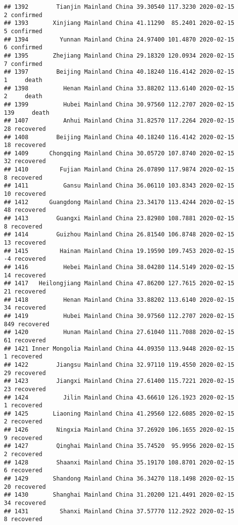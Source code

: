 \documentclass[
]{article}
\begin{document}
\begin{verbatim}
## 1392        Tianjin Mainland China 39.30540 117.3230 2020-02-15     2 confirmed
## 1393       Xinjiang Mainland China 41.11290  85.2401 2020-02-15     5 confirmed
## 1394         Yunnan Mainland China 24.97400 101.4870 2020-02-15     6 confirmed
## 1395       Zhejiang Mainland China 29.18320 120.0934 2020-02-15     7 confirmed
## 1397        Beijing Mainland China 40.18240 116.4142 2020-02-15     1     death
## 1398          Henan Mainland China 33.88202 113.6140 2020-02-15     2     death
## 1399          Hubei Mainland China 30.97560 112.2707 2020-02-15   139     death
## 1407          Anhui Mainland China 31.82570 117.2264 2020-02-15    28 recovered
## 1408        Beijing Mainland China 40.18240 116.4142 2020-02-15    18 recovered
## 1409      Chongqing Mainland China 30.05720 107.8740 2020-02-15    32 recovered
## 1410         Fujian Mainland China 26.07890 117.9874 2020-02-15     8 recovered
## 1411          Gansu Mainland China 36.06110 103.8343 2020-02-15    10 recovered
## 1412      Guangdong Mainland China 23.34170 113.4244 2020-02-15    48 recovered
## 1413        Guangxi Mainland China 23.82980 108.7881 2020-02-15     8 recovered
## 1414        Guizhou Mainland China 26.81540 106.8748 2020-02-15    13 recovered
## 1415         Hainan Mainland China 19.19590 109.7453 2020-02-15    -4 recovered
## 1416          Hebei Mainland China 38.04280 114.5149 2020-02-15    14 recovered
## 1417   Heilongjiang Mainland China 47.86200 127.7615 2020-02-15    21 recovered
## 1418          Henan Mainland China 33.88202 113.6140 2020-02-15    34 recovered
## 1419          Hubei Mainland China 30.97560 112.2707 2020-02-15   849 recovered
## 1420          Hunan Mainland China 27.61040 111.7088 2020-02-15    61 recovered
## 1421 Inner Mongolia Mainland China 44.09350 113.9448 2020-02-15     1 recovered
## 1422        Jiangsu Mainland China 32.97110 119.4550 2020-02-15    29 recovered
## 1423        Jiangxi Mainland China 27.61400 115.7221 2020-02-15    23 recovered
## 1424          Jilin Mainland China 43.66610 126.1923 2020-02-15     1 recovered
## 1425       Liaoning Mainland China 41.29560 122.6085 2020-02-15     2 recovered
## 1426        Ningxia Mainland China 37.26920 106.1655 2020-02-15     9 recovered
## 1427        Qinghai Mainland China 35.74520  95.9956 2020-02-15     2 recovered
## 1428        Shaanxi Mainland China 35.19170 108.8701 2020-02-15     6 recovered
## 1429       Shandong Mainland China 36.34270 118.1498 2020-02-15    20 recovered
## 1430       Shanghai Mainland China 31.20200 121.4491 2020-02-15    34 recovered
## 1431         Shanxi Mainland China 37.57770 112.2922 2020-02-15     8 recovered

\end{verbatim}
\end{document}
